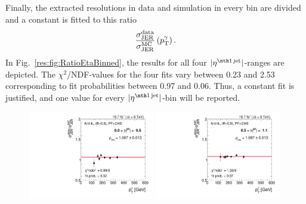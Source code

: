Finally, the extracted resolutions in data and simulation in every \ptgamma bin are divided and a constant is fitted to this ratio
\begin{equation}
\frac{\sigma_\mathrm{JER}^{\text{data}}}{\sigma_\mathrm{JER}^{\text{MC}}} \left( p_{\text{T}}^{\gamma} \right).
\end{equation}
In Fig.~\ref{res:fig:RatioEtaBinned}, the results for all four $|\etafirstjet|$-ranges are depicted. 
The $\chi^2$/NDF-values for the four fits vary between 0.23 and 2.53 corresponding to fit probabilities between 0.97 and 0.06. 
Thus, a constant fit is justified, and one value for every $|\etafirstjet|$-bin will be reported.

\begin{figure}[!t]
 \centering
    \includegraphics[width=0.49\textwidth]{figures/resolution/results/Ratio_Resolution_for_1_eta_bin_PFCHS_data_comparison_RMS99.pdf}
    \includegraphics[width=0.49\textwidth]{figures/resolution/results/Ratio_Resolution_for_2_eta_bin_PFCHS_data_comparison_RMS99.pdf}
    \vspace{18pt}


\end{figure}
